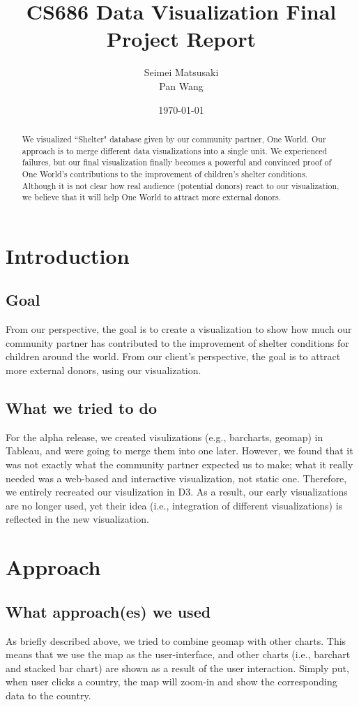 \documentclass[a4paper]{article}
\title{CS686 Data Visualization Final Project Report}
\author{Seimei Matsusaki \\ Pan Wang}
\date{\today}
\begin{document}
\maketitle

\begin{abstract}
We visualized “Shelter" database given by our community partner, One World. Our approach is to merge different data visualizations into a single unit. We experienced failures, but our final visualization finally becomes a powerful and convinced proof of One World’s contributions to the improvement of children’s shelter conditions. Although it is not clear how real audience (potential donors) react to our visualization, we believe that it will help One World to attract more external donors.

\end{abstract}

\section{Introduction}
\subsection{Goal}
From our perspective, the goal is to create a visualization to show how much our community partner has contributed to the improvement of shelter conditions for children around the world. From our client's perspective, the goal is to attract more external donors, using our visualization.
\subsection{What we tried to do}
For the alpha release, we created visulizations (e.g., barcharts, geomap) in Tableau, and were going to merge them into one later. However, we found that it was not exactly what the community partner expected us to make; what it really needed was a web-based and interactive visualization, not static one. Therefore, we entirely recreated our visulization in D3. As a result, our early visualizations are no longer used, yet their idea (i.e., integration of different visualizations) is reflected in the new visualization.


\section{Approach}
\label{sec:examples}
\subsection{What approach(es) we used}
As briefly described above, we tried to combine geomap with other charts. This means that we use the map as the user-interface, and other charts (i.e., barchart and stacked bar chart) are shown as a result of the user interaction. Simply put, when user clicks a country, the map will zoom-in and show the corresponding data to the country.
\end{document}
